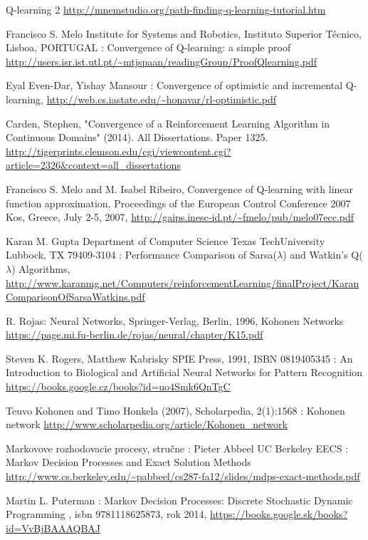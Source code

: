 \begin{thebibliography}{99}
 Q-learning 2
\url{http://mnemstudio.org/path-finding-q-learning-tutorial.htm}


 Francisco S. Melo
Institute for Systems and Robotics,
Instituto Superior Técnico,
Lisboa, PORTUGAL : Convergence of Q-learning:  a simple proof
\url{http://users.isr.ist.utl.pt/~mtjspaan/readingGroup/ProofQlearning.pdf}

 Eyal Even-Dar, Yishay Mansour :
Convergence of optimistic and incremental Q-learning,
\url{http://web.cs.iastate.edu/~honavar/rl-optimistic.pdf}


Carden, Stephen, "Convergence of a Reinforcement Learning Algorithm in Continuous Domains" (2014).
All Dissertations. Paper 1325.
\url{http://tigerprints.clemson.edu/cgi/viewcontent.cgi?article=2326&context=all_dissertations}

 Francisco S. Melo and M. Isabel Ribeiro,
Convergence of Q-learning with linear function approximation,
Proceedings of the European Control Conference 2007 Kos, Greece, July 2-5, 2007,
\url{http://gaips.inesc-id.pt/~fmelo/pub/melo07ecc.pdf}

 Karan M. Gupta Department of Computer Science Texas TechUniversity Lubbock, TX 79409-3104 :
Performance Comparison of Sarsa($\lambda$) and Watkin’s Q($\lambda$) Algorithms,
\url{http://www.karanmg.net/Computers/reinforcementLearning/finalProject/KaranComparisonOfSarsaWatkins.pdf}


 R. Rojas: Neural Networks, Springer-Verlag, Berlin, 1996, Kohonen Networks
\url{https://page.mi.fu-berlin.de/rojas/neural/chapter/K15.pdf}

 Steven K. Rogers, Matthew Kabrisky
SPIE Press, 1991, ISBN	0819405345 : An Introduction to Biological and Artificial Neural Networks for Pattern Recognition
\url{https://books.google.cz/books?id=uo4Smk6QnTgC}

 Teuvo Kohonen and Timo Honkela (2007), Scholarpedia, 2(1):1568 : Kohonen network
\url{http://www.scholarpedia.org/article/Kohonen_network}

 Markovove rozhodovacie procesy, stručne :
Pieter Abbeel  UC Berkeley EECS : Markov Decision Processes and Exact Solution Methods
\url{http://www.cs.berkeley.edu/~pabbeel/cs287-fa12/slides/mdps-exact-methods.pdf}

 Martin L. Puterman : Markov Decision Processes: Discrete Stochastic Dynamic Programming
, isbn 9781118625873, rok 2014, \url{https://books.google.sk/books?id=VvBjBAAAQBAJ}


\end{thebibliography}
